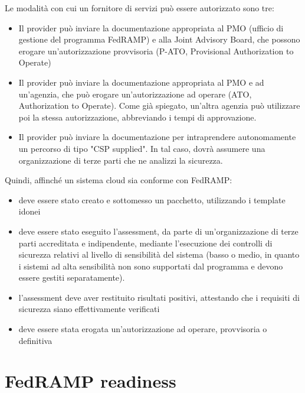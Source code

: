 \documentclass[../main.tex]{subfiles}
\begin{document}
Le modalità con cui un fornitore di servizi può essere autorizzato sono tre:
\begin{itemize}
    \item Il provider può inviare la documentazione appropriata al PMO (ufficio di gestione del programma FedRAMP) e alla Joint Advisory Board, che possono erogare un'autorizzazione provvisoria (P-ATO, Provisional Authorization to Operate) 
    \item Il provider può inviare la documentazione appropriata al PMO e ad un'agenzia, che può erogare un'autorizzazione ad operare (ATO, Authorization to Operate). Come già spiegato, un'altra agenzia può utilizzare poi la stessa autorizzazione, abbreviando i tempi di approvazione.
    \item Il provider può inviare la documentazione per intraprendere autonomamente un percorso di tipo "CSP supplied". In tal caso, dovrà assumere una organizzazione di terze parti che ne analizzi la sicurezza.
\end{itemize}

Quindi, affinché un sistema cloud sia conforme con FedRAMP:
\begin{itemize}
    \item deve essere stato creato e sottomesso un pacchetto, utilizzando i template idonei
    \item deve essere stato eseguito l'assessment, da parte di un'organizzazione di terze parti accreditata e indipendente, mediante l'esecuzione dei controlli di sicurezza relativi al livello di sensibilità del sistema (basso o medio, in quanto i sistemi ad alta sensibilità non sono supportati dal programma e devono essere gestiti separatamente).
    \item l'assessment deve aver restituito risultati positivi, attestando che i requisiti di sicurezza siano effettivamente verificati
    \item deve essere stata erogata un'autorizzazione ad operare, provvisoria o definitiva
\end{itemize}

\section{FedRAMP readiness}
\end{document}
